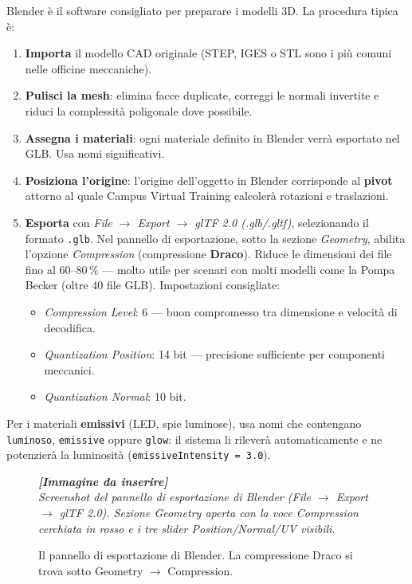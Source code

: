 ﻿\documentclass[a4paper,12pt,oneside]{book}
\newcommand{\file}[1]{\texttt{#1}}
\newcommand{\imgph}[2]{%
  \begin{tcolorbox}[colback=cvtlightblue!30,colframe=cvtblue!40,%
    width=#1,halign=center,valign=center,height=5cm,boxrule=0.5pt,arc=3pt]%
    \textcolor{cvtgray}{\itshape\footnotesize\textbf{[Immagine da inserire]}\\[3pt]#2}%
  \end{tcolorbox}}
\begin{document}
Blender è il software consigliato per preparare i modelli 3D. La
procedura tipica è:

\begin{enumerate}
  \item \textbf{Importa} il modello CAD originale (STEP, IGES o STL sono
        i più comuni nelle officine meccaniche).
  \item \textbf{Pulisci la mesh}: elimina facce duplicate, correggi le
        normali invertite e riduci la complessità poligonale dove
        possibile.
  \item \textbf{Assegna i materiali}: ogni materiale definito in Blender
        verrà esportato nel GLB. Usa nomi significativi.
  \item \textbf{Posiziona l'origine}: l'origine dell'oggetto in Blender
        corrisponde al \textbf{pivot} attorno al quale Campus Virtual
        Training calcolerà rotazioni e traslazioni.
  \item \textbf{Esporta} con \emph{File $\rightarrow$ Export $\rightarrow$
        glTF 2.0 (.glb/.gltf)}, selezionando il formato \file{.glb}.
        Nel pannello di esportazione, sotto la sezione \emph{Geometry},
        abilita l'opzione \emph{Compression} (compressione \textbf{Draco}).
        Riduce le dimensioni dei file fino al 60--80\,\% --- molto utile
        per scenari con molti modelli come la Pompa Becker (oltre 40 file
        GLB). Impostazioni consigliate:
    \begin{itemize}
      \item \emph{Compression Level}: 6 --- buon compromesso tra
            dimensione e velocità di decodifica.
      \item \emph{Quantization Position}: 14 bit --- precisione sufficiente
            per componenti meccanici.
      \item \emph{Quantization Normal}: 10 bit.
    \end{itemize}
\end{enumerate}

\begin{trucchetto}
Per i materiali \textbf{emissivi} (LED, spie luminose), usa nomi che
contengano \texttt{luminoso}, \texttt{emissive} oppure \texttt{glow}:
il sistema li rileverà automaticamente e ne potenzierà la luminosità
(\texttt{emissiveIntensity = 3.0}).
\end{trucchetto}

\begin{figure}[H]
  \centering
  \imgph{12cm}{Screenshot del pannello di esportazione di Blender (File $\rightarrow$ Export $\rightarrow$ glTF 2.0). Sezione \emph{Geometry} aperta con la voce \emph{Compression} cerchiata in rosso e i tre slider Position/Normal/UV visibili.}
  \caption{Il pannello di esportazione di Blender. La compressione Draco si trova sotto Geometry $\rightarrow$ Compression.}
  \label{fig:blender-export}
\end{figure}
\end{document}
